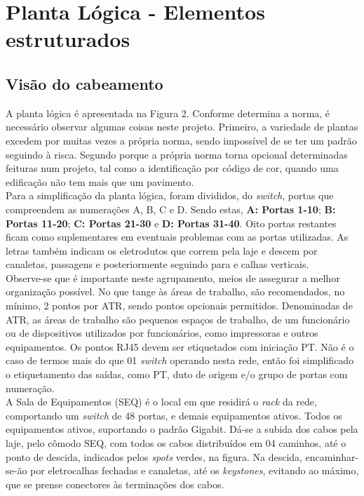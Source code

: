 \documentclass[	DIV=calc,%
							paper=a4,%
							fontsize=12pt,%
							onecolumn]{scrartcl}	 					%
\begin{document}
\clearpage
{}
\recalctypearea


\section{Planta Lógica - Elementos estruturados}

\subsection{Visão do cabeamento}
A planta lógica é apresentada na Figura 2. Conforme determina a norma, é necessário observar algumas coisas neste projeto. Primeiro, a variedade de plantas excedem por muitas vezes a própria norma, sendo impossível de se ter um padrão seguindo à risca. Segundo porque a própria norma torna opcional determinadas feituras num projeto, tal como a identificação por código de cor, quando uma edificação não tem mais que um pavimento.
\\

Para a simplificação da planta lógica, foram divididos, do \textit{switch}, portas que compreendem as numerações A, B, C e D. Sendo estas, \textbf{A: Portas 1-10}; \textbf{B: Portas 11-20}; \textbf{C: Portas 21-30} e \textbf{D: Portas 31-40}. Oito portas restantes ficam como suplementares em eventuais problemas com as portas utilizadas. As letras também indicam os eletrodutos que correm pela laje e descem por canaletas, passagens e posteriormente seguindo para e calhas verticais. 
\\

Observe-se que é importante neste agrupamento, meios de assegurar a melhor organização possível. No que tange às áreas de trabalho, são recomendados, no mínimo, 2 pontos por ATR, sendo pontos opcionais permitidos. Denominadas de ATR, as áreas de trabalho são pequenos espaços de trabalho, de um funcionário ou de dispositivos utilizados por funcionários, como impressoras e outros equipamentos. Os pontos RJ45 devem ser etiquetados com iniciação PT. Não é o caso de termos mais do que 01 \textit{switch} operando nesta rede, então foi simplificado o etiquetamento das saídas, como PT, duto de origem e/o grupo de portas com numeração.
\\

A Sala de Equipamentos (SEQ) é o local em que residirá o \textit{rack} da rede, comportando um \textit{switch} de 48 portas, e demais equipamentos ativos. Todos os equipamentos ativos, suportando o padrão Gigabit. Dá-se a subida dos cabos pela laje, pelo cômodo SEQ, com todos os cabos distribuídos em 04 caminhos, até o ponto de descida, indicados pelos \textit{spots} verdes, na figura. Na descida, encaminhar-se-ão por eletrocalhas fechadas e canaletas, até os \textit{keystones}, evitando ao máximo, que se prense conectores às terminações dos cabos. 
\\
\end{document}
